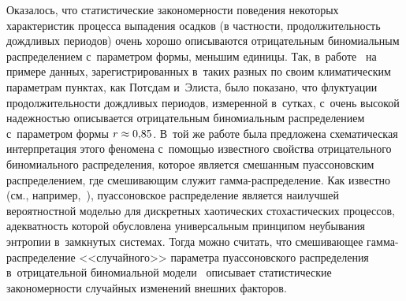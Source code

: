 \begin{multicols}{2}
Оказалось, что статистические закономерности поведения некоторых
характеристик процесса выпадения осадков (в частности,
продолжительность дождливых периодов) очень хорошо описываются
отрицательным биномиальным распределением с~параметром формы,
меньшим единицы. Так, в~работе~\cite{Gulev} на примере данных,
зарегистрированных в~таких разных по своим климатическим па\-ра\-мет\-рам
пунктах, как Потсдам и~Элиста, было показано, что флуктуации
продолжительности дождливых периодов, измеренной в~сутках, с~очень
высокой надежностью описывается отрицательным биномиальным
распределением с~параметром формы $r\hm\approx 0{,}85$. В~той же работе
была предложена схематическая интерпретация этого феномена с~по\-мощью
известного свойства отрицательного биномиального распределения,
которое является смешанным пуассоновским распределением, где
смешивающим служит гам\-ма-рас\-пре\-де\-ле\-ние. Как известно (см., 
например,~\cite{Kingman1993, KorolevBeningShorgin2011}), пуассоновское
распределение является наилучшей вероятностной моделью для
дискретных хаотических стохастических\linebreak
 процессов, адекватность
которой обусловлена универсальным принципом неубывания энтропии\linebreak 
в~за\-мк\-ну\-тых системах. Тогда можно считать, что смешивающее
гам\-ма-рас\-пре\-де\-ле\-ние <<случайного>> парамет\-ра пуассоновского
распределения в~отрицательной биномиальной модели~\cite{Gulev}
описывает статистические закономерности случайных изменений внешних
факторов.


\end{multicols}
